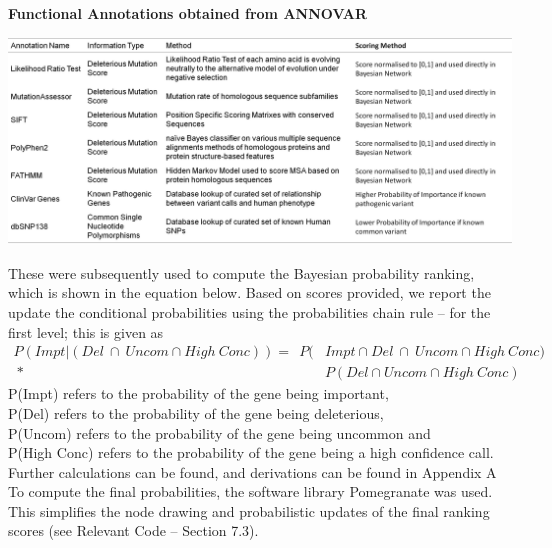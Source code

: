 \documentclass{article}
\begin{document}
\begin{table}[H]
\caption{\textbf{Functional Annotations obtained from ANNOVAR}}
\includegraphics[width=\textwidth]{annovarfeatures.png}
\centering
\end{table}

These were subsequently used to compute the Bayesian probability ranking, which is shown in the equation below. Based on scores provided, we report the update the conditional probabilities using the probabilities chain rule -- for the first level; this is given as \\
\begin{equation}
\begin{split}
P(Impt | (Del  \ \cap \ Uncom  \cap High\ Conc)) =  \ \ P(&Impt \cap Del  \ \cap \ Uncom \cap High \ Conc ) \\ \ * \ & P(Del  \cap Uncom  \cap High \ Conc )
\end{split}
\end{equation}
\tiny
\indent
P(Impt) refers to the probability of the gene being important,\\
\indent P(Del) refers to the probability of the gene being deleterious,\\ 
\indent P(Uncom) refers to the probability of the gene being uncommon and\\  \indent P(High Conc) refers to the probability of the gene being a high confidence call.\\ \indent Further calculations can be found, and derivations can be found in Appendix A\\

\normalsize
\noindent
To compute the final probabilities, the software library Pomegranate was used. This simplifies the node drawing and probabilistic updates of the final ranking scores (see Relevant Code -- Section 7.3).
\end{document}
